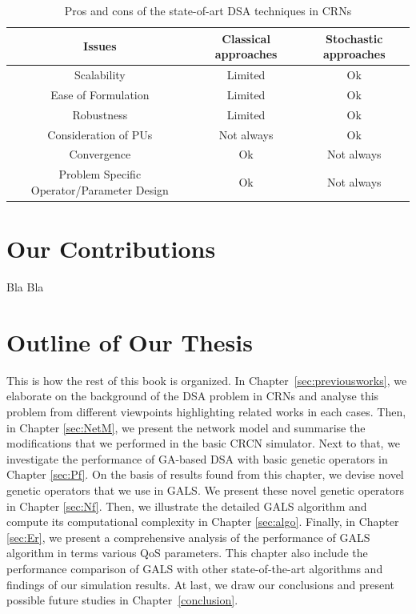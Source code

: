 \begin{table}[!thb]
\vspace{2mm}
\begin{center}
\caption{Pros and cons of the state-of-art DSA techniques in CRNs}\vspace{-2mm}
\begin{tabular}{|c|c|c|}
\hline
\textbf{Issues} & \textbf{Classical approaches} & \textbf{Stochastic approaches} \\
\hline \hline
Scalability & Limited & Ok \\
 \hline
Ease of Formulation & Limited & Ok \\
 \hline
 Robustness & Limited & Ok \\
 \hline
Consideration of PUs & Not always & Ok \\
 \hline
 Convergence & Ok & Not always \\
 \hline
 Problem Specific Operator/Parameter Design & Ok & Not always \\
\hline
\end{tabular}
\label{iss}
\end{center}
\end{table}


\section{Our Contributions}
Bla Bla

\section{Outline of Our Thesis}
This is how the rest of this book is organized. In Chapter~\ref{sec:previousworks}, we elaborate on the background of the DSA problem in CRNs  and analyse this problem from different viewpoints highlighting related works in each cases. Then, in Chapter \ref{sec:NetM}, we present the network model and summarise the modifications that we performed in the basic CRCN simulator. Next to that, we investigate the performance of GA-based DSA with basic genetic operators in Chapter \ref{sec:Pf}. On the basis of results found from this chapter, we devise novel genetic operators that we use in GALS. We present these novel genetic operators in Chapter \ref{sec:Nf}. Then, we illustrate the detailed GALS algorithm and compute its computational complexity in Chapter \ref{sec:algo}. Finally, in Chapter \ref{sec:Er}, we present a comprehensive analysis of the performance of GALS algorithm in terms various QoS parameters. This chapter also include the performance comparison of GALS with other state-of-the-art algorithms and findings of our simulation results. At last, we draw our conclusions and present possible future studies in Chapter~\ref{conclusion}.
